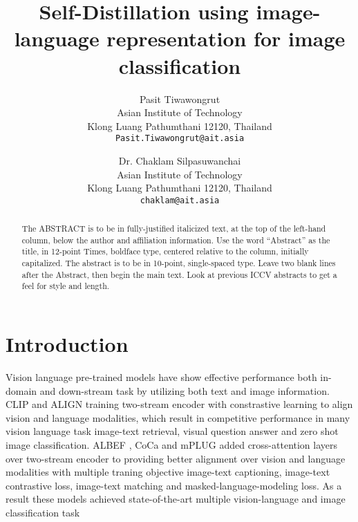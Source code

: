 \documentclass[10pt,twocolumn,letterpaper]{article}
\begin{document}
\title{Self-Distillation using image-language representation for image classification}

\author{Pasit Tiwawongrut\\
Asian Institute of Technology\\
Klong Luang Pathumthani 12120, Thailand\\
{\tt\small Pasit.Tiwawongrut@ait.asia}
\and
Dr. Chaklam Silpasuwanchai\\
Asian Institute of Technology\\
Klong Luang Pathumthani 12120, Thailand\\
{\tt\small chaklam@ait.asia}
}

\maketitle
\ificcvfinal\thispagestyle{empty}\fi

\begin{abstract}
   The ABSTRACT is to be in fully-justified italicized text, at the top
   of the left-hand column, below the author and affiliation
   information. Use the word ``Abstract'' as the title, in 12-point
   Times, boldface type, centered relative to the column, initially
   capitalized. The abstract is to be in 10-point, single-spaced type.
   Leave two blank lines after the Abstract, then begin the main text.
   Look at previous ICCV abstracts to get a feel for style and length.
\end{abstract}

\section{Introduction}

Vision language pre-trained models have show effective performance both in-domain and down-stream task by utilizing both text and image information.
CLIP \cite{clip} and ALIGN \cite{align} training two-stream encoder with constrastive learning to align vision and language modalities, which result in competitive performance in many vision language task \eg image-text retrieval, visual question answer and zero shot image classification.
ALBEF \cite{albef}, CoCa \cite{coca} and mPLUG \cite{mplug} added cross-attention layers over two-stream encoder to providing better alignment over vision and language modalities with multiple traning objective \eg image-text captioning, image-text contrastive loss, image-text matching and masked-language-modeling loss.
As a result these models achieved state-of-the-art multiple vision-language and image classification task
\end{document}
